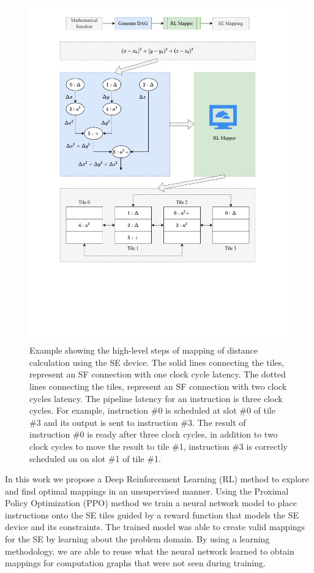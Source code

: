 \begin{figure}
    \centering
    \includegraphics[trim=70 180 70 25, clip, width=\linewidth]{fig/SE_example.pdf}
    \caption{
      Example showing the high-level steps of mapping of distance calculation using the SE device.
      The solid lines connecting the tiles, represent an SF connection with one clock cycle latency.
      The dotted lines connecting the tiles, represent an SF connection with two clock cycles latency.
      The pipeline latency for an instruction is three clock cycles.
      For example, instruction \#0 is scheduled at slot \#0 of tile \#3 and its output is sent to instruction \#3.
      The result of instruction \#0 is ready after three clock cycles, in addition to two clock cycles to move the result to tile \#1, instruction \#3 is correctly scheduled on on slot \#1 of tile \#1.
    }
    \label{fig:se_example}
  \end{figure}


In this work we propose a Deep Reinforcement Learning (RL) method to explore and find optimal mappings in an unsupervised manner. 
Using the Proximal Policy Optimization (PPO) method we train a neural network model to place instructions onto the SE tiles guided by a reward function that models the SE device and its constraints. 
The trained model was able to create valid mappings for the SE by learning about the problem domain. 
By using a learning methodology, we are able to reuse what the neural network learned to obtain mappings for computation graphs that were not seen during training.  

